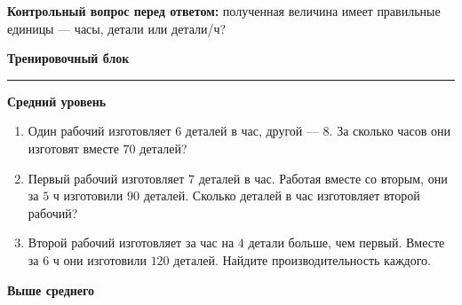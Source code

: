 \documentclass[a4paper,12pt]{article}
\newcommand{\lessonsection}[1]{%
  \vspace{0.35em}
  {\Large\bfseries\textcolor{darkaccent}{#1}}\par
  \vspace{0.2em}
  {\color{accent}\rule{\linewidth}{0.6pt}}\par
  \vspace{0.4em}
}
\begin{document}
\textbf{Контрольный вопрос перед ответом:}
полученная величина имеет правильные единицы ---
часы, детали или детали/ч?

\clearpage

\lessonsection{Тренировочный блок}

\textbf{Средний уровень}

\begin{enumerate}[label=\textbf{\arabic*.}]

  \item
  Один рабочий изготовляет $6$ деталей в час,
  другой --- $8$.
  За сколько часов они изготовят вместе $70$ деталей?

  \item
  Первый рабочий изготовляет $7$ деталей в час.
  Работая вместе со вторым,
  они за $5$ ч изготовили $90$ деталей.
  Сколько деталей в час изготовляет второй рабочий?

  \item
  Второй рабочий изготовляет за час
  на $4$ детали больше, чем первый.
  Вместе за $6$ ч они изготовили $120$ деталей.
  Найдите производительность каждого.

\end{enumerate}

\vspace{0.5em}

\textbf{Выше среднего}
\end{document}
